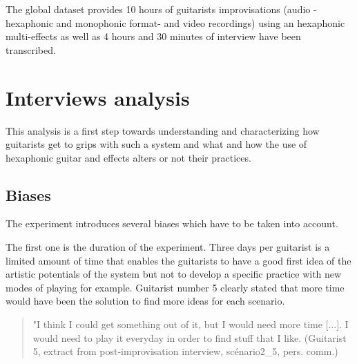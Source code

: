 \documentclass{article}
\begin{document}
The global dataset provides 10 hours of guitarists improvisations (audio -hexaphonic and monophonic format- and video recordings) using an hexaphonic multi-effects as well as 4 hours and 30 minutes of interview have been transcribed.

    
    


\section{Interviews analysis}
\label{itw_analysis}

This analysis is a first step towards understanding and characterizing how guitarists get to grips with such a system and what and how the use of hexaphonic guitar and effects alters or not their practices. 

\subsection{Biases}
The experiment introduces several biases which have to be taken into account.

The first one is the duration of the experiment. Three days per guitarist is a limited amount of time that enables the guitarists to have a good first idea of the artistic potentials of the system but not to develop a specific practice with new modes of playing for example. Guitarist number 5 clearly stated that more time would have been the solution to find more ideas for each scenario. 

\begin{quote}
    "I think I could get something out of it, but I would need more time [...]. I would need to play it everyday in order to find stuff that I like. (Guitarist 5, extract from post-improvisation interview, scénario2\_5, pers. comm.)
\end{quote}
\end{document}
